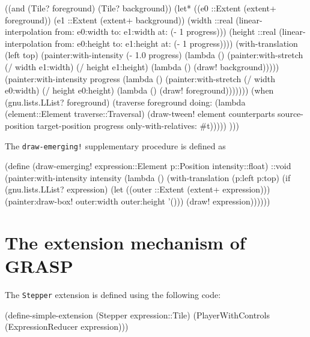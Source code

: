 \documentclass[acmsmall]{acmart}
\newenvironment{Snippet}{\Verbatim[samepage=true]}{\endVerbatim}
\begin{document}
\begin{Snippet}
     ((and (Tile? foreground)
	   (Tile? background))
      (let* ((e0 ::Extent (extent+ foreground))
	     (e1 ::Extent (extent+ background))
	     (width ::real (linear-interpolation from: e0:width to: e1:width
						 at: (- 1 progress)))
	     (height ::real (linear-interpolation from: e0:height to: e1:height
	 					  at: (- 1 progress))))
\end{Snippet}
\begin{Snippet}
	(with-translation (left top)
	  (painter:with-intensity (- 1.0 progress)
	    (lambda ()
	      (painter:with-stretch (/ width e1:width)
                  (/ height e1:height)
		(lambda ()
		  (draw! background)))))
\end{Snippet}
\begin{Snippet}
	  (painter:with-intensity progress
	    (lambda ()
	      (painter:with-stretch (/ width e0:width)
                  (/ height e0:height)
		(lambda ()
		  (draw! foreground)))))))
\end{Snippet}
\begin{Snippet}
      (when (gnu.lists.LList? foreground)
	(traverse foreground
		  doing:
		  (lambda (element::Element traverse::Traversal)
		    (draw-tween! element counterparts
				 source-position
				 target-position
				 progress
				 only-with-relatives: #t)))))
     )))
\end{Snippet}

The \texttt{draw-emerging!} supplementary procedure is defined as

\begin{Snippet}
(define (draw-emerging! expression::Element p::Position
			intensity::float)
  ::void
  (painter:with-intensity intensity
    (lambda ()
      (with-translation (p:left p:top)
	(if (gnu.lists.LList? expression)
	    (let ((outer ::Extent (extent+ expression)))
	      (painter:draw-box! outer:width outer:height '()))
	    (draw! expression))))))
\end{Snippet}

\section{The extension mechanism of GRASP}

The \texttt{Stepper} extension is defined using the following code:

\begin{Snippet}
(define-simple-extension (Stepper expression::Tile)
  (PlayerWithControls (ExpressionReducer expression)))
\end{Snippet}
\end{document}

